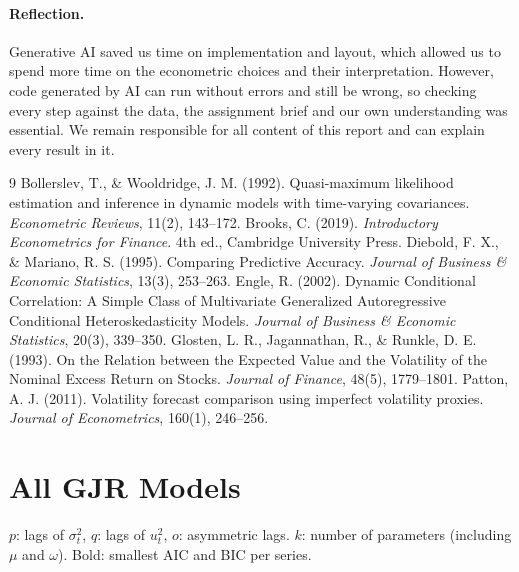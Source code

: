 \documentclass[10pt,a4paper]{article}
\begin{document}
\paragraph{Reflection.} Generative AI saved us time on implementation and layout, which allowed us to spend more time on the econometric choices and their interpretation. However, code generated by AI can run without errors and still be wrong, so checking every step against the data, the assignment brief and our own understanding was essential. We remain responsible for all content of this report and can explain every result in it.

\begin{thebibliography}{9}
Bollerslev, T., \& Wooldridge, J. M. (1992). Quasi-maximum likelihood estimation and inference in dynamic
models with time-varying covariances. \textit{Econometric Reviews}, 11(2), 143--172.
Brooks, C. (2019). \textit{Introductory Econometrics for Finance}. 4th ed., Cambridge University Press.
Diebold, F. X., \& Mariano, R. S. (1995). Comparing Predictive Accuracy. \textit{Journal of Business \&
Economic Statistics}, 13(3), 253--263.
Engle, R. (2002). Dynamic Conditional Correlation: A Simple Class of Multivariate Generalized
Autoregressive Conditional Heteroskedasticity Models. \textit{Journal of Business \& Economic Statistics},
20(3), 339--350.
Glosten, L. R., Jagannathan, R., \& Runkle, D. E. (1993). On the Relation between the Expected Value and
the Volatility of the Nominal Excess Return on Stocks. \textit{Journal of Finance}, 48(5), 1779--1801.
Patton, A. J. (2011). Volatility forecast comparison using imperfect volatility proxies. \textit{Journal of
Econometrics}, 160(1), 246--256.
\end{thebibliography}

\clearpage
\appendix
\section{All GJR Models}
\begin{table}[htbp]
\centering
\caption{Fit of all 36 GJR$(p,q,o)$ models}\label{tab:grid}
\footnotesize
\setlength{\tabcolsep}{4.5pt}

\par\smallskip
\begin{minipage}{0.95\textwidth}\footnotesize
$p$: lags of $\sigma^2_t$, $q$: lags of $u_t^2$, $o$: asymmetric lags. $k$: number of parameters
(including $\mu$ and $\omega$). Bold: smallest AIC and BIC per series.
\end{minipage}
\end{table}
\end{document}
